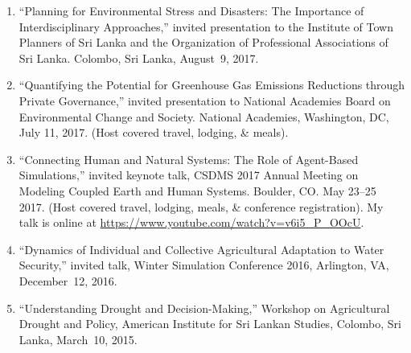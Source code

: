 \begin{enumerate}
\item ``Planning for Environmental Stress and Disasters: The Importance of Interdisciplinary Approaches,'' invited presentation to the Institute of Town Planners of Sri Lanka and the Organization of Professional Associations of Sri Lanka. Colombo, Sri Lanka, August~9, 2017.
\item ``Quantifying the Potential for Greenhouse Gas Emissions Reductions through Private Governance,'' invited presentation to National Academies Board on Environmental Change and Society. National Academies, Washington, DC, July 11, 2017. (Host covered travel, lodging, \& meals).
\item  ``Connecting Human and Natural Systems: The Role of Agent-Based Simulations,'' invited keynote talk, CSDMS 2017 Annual Meeting on Modeling Coupled Earth and Human Systems. Boulder, CO. May 23--25 2017. (Host covered travel, lodging, meals, \& conference registration). My talk is online at \url{https://www.youtube.com/watch?v=v6i5_P_OOcU}.
\item  ``Dynamics of Individual and Collective Agricultural Adaptation to Water Security,'' invited talk, Winter Simulation Conference 2016, Arlington, VA, December~12, 2016.
\item ``Understanding Drought and Decision-Making,'' Workshop on Agricultural Drought and Policy, American Institute for Sri Lankan Studies, Colombo, Sri Lanka, March~10, 2015.
\end{enumerate}

